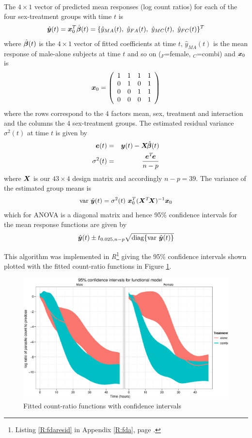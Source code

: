 The $4\times 1$ vector of predicted mean responses (log count ratios) for each of the four sex-treatment groups with time $t$ is
$$\hat{\mat{y}}(t)=\mat{x}_{0}^{T}\hat{\mat{\beta}}(t)=\{\hat{y}_{MA}(t),\ \hat{y}_{FA}(t),\ \hat{y}_{MC}(t),\ \hat{y}_{FC}(t)\}^{T}$$
where $\hat{\mat{\beta}}(t)$ is the $4\times 1$ vector of fitted coefficients at time $t$, $\hat{y}_{MA}(t)$ is the mean response of male-alone subjects at time $t$ and so on ($_{F}$=female, $_{C}$=combi) and $\mat{x}_{0}$ is
$$\mat{x}_{0}=\left(\begin{array}{cccc}
1  &  1  &  1  &  1 \\
0  &  1  &  0  &  1 \\
0  &  0  & 1  &  1 \\
0  &  0  &  0  &  1\end{array}\right)$$
where the rows correspond to the 4 factors mean, sex, treatment and interaction and the columns the 4 sex-treatment groups. The estimated residual variance $\sigma^{2}(t)$ at time $t$ is given by
\begin{eqnarray*}
\mat{e}(t)&=&\mat{y}(t)-\mat{X}\!\hat{\mat{\beta}}(t)\\
\sigma^{2}(t)&=&\frac{\mat{e}^{T}\!\mat{e}}{n-p}
\end{eqnarray*}
where $\mat{X}$ is our $43\times 4$ design matrix and accordingly $n-p=39$. The variance of the estimated group means is
$$\mathrm{var}\ \hat{\mat{y}}(t)=\sigma^{2}(t)\ \mat{x}_{0}^{T}(\mat{X}^{T}\!\mat{X})^{-1}\mat{x}_{0}$$
which for ANOVA is a diagonal matrix and hence 95\% confidence intervals for the mean response functions are given by
$$\hat{\mat{y}}(t)\pm t_{0.025,n-p}\sqrt{\mathrm{diag}\{\mathrm{var}\ \hat{\mat{y}}(t)\}}$$

This algorithm was implemented in \emph{R}\footnote{Listing \ref{R:fdaresid} in Appendix \ref{R:fda}, page \pageref{R:fdaresid}.} giving the 95\% confidence intervals shown plotted with the fitted count-ratio functions in Figure \ref{fdfitted}.
\begin{figure}[p]
\includegraphics[width=150mm]{lprr2i.eps} 
\caption{Fitted count-ratio functions with confidence intervals}
\label{fdfitted}
\end{figure}

